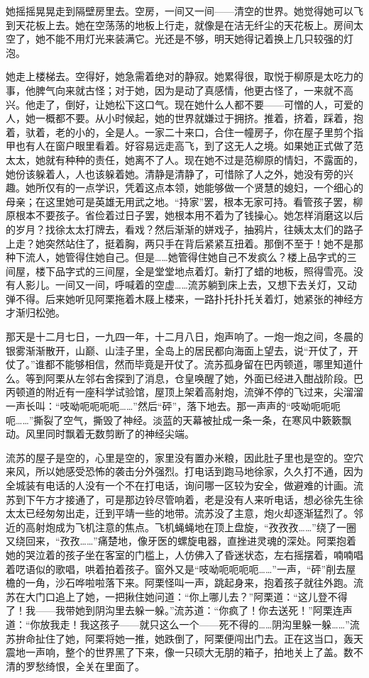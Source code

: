 \par 她摇摇晃晃走到隔壁房里去。空房，一间又一间——清空的世界。她觉得她可以飞到天花板上去。她在空荡荡的地板上行走，就像是在洁无纤尘的天花板上。房间太空了，她不能不用灯光来装满它。光还是不够，明天她得记着换上几只较强的灯泡。
\par 她走上楼梯去。空得好，她急需着绝对的静寂。她累得很，取悦于柳原是太吃力的事，他脾气向来就古怪；对于她，因为是动了真感情，他更古怪了，一来就不高兴。他走了，倒好，让她松下这口气。现在她什么人都不要——可憎的人，可爱的人，她一概都不要。从小时候起，她的世界就嫌过于拥挤。推着，挤着，踩着，抱着，驮着，老的小的，全是人。一家二十来口，合住一幢房子，你在屋子里剪个指甲也有人在窗户眼里看着。好容易远走高飞，到了这无人之境。如果她正式做了范太太，她就有种种的责任，她离不了人。现在她不过是范柳原的情妇，不露面的，她份该躲着人，人也该躲着她。清静是清静了，可惜除了人之外，她没有旁的兴趣。她所仅有的一点学识，凭着这点本领，她能够做一个贤慧的媳妇，一个细心的母亲；在这里她可是英雄无用武之地。“持家”罢，根本无家可持。看管孩子罢，柳原根本不要孩子。省俭着过日子罢，她根本用不着为了钱操心。她怎样消磨这以后的岁月？找徐太太打牌去，看戏？然后渐渐的姘戏子，抽鸦片，往姨太太们的路子上走？她突然站住了，挺着胸，两只手在背后紧紧互扭着。那倒不至于！她不是那种下流人，她管得住她自己。但是……她管得住她自己不发疯么？楼上品字式的三间屋，楼下品字式的三间屋，全是堂堂地点着灯。新打了蜡的地板，照得雪亮。没有人影儿。一间又一间，呼喊着的空虚……流苏躺到床上去，又想下去关灯，又动弹不得。后来她听见阿栗拖着木屐上楼来，一路扑托扑托关着灯，她紧张的神经方才渐归松弛。
\par 那天是十二月七日，一九四一年，十二月八日，炮声响了。一炮一炮之间，冬晨的银雾渐渐散开，山巅、山洼子里，全岛上的居民都向海面上望去，说“开仗了，开仗了。”谁都不能够相信，然而毕竟是开仗了。流苏孤身留在巴丙顿道，哪里知道什么。等到阿栗从左邻右舍探到了消息，仓皇唤醒了她，外面已经进入酣战阶段。巴丙顿道的附近有一座科学试验馆，屋顶上架着高射炮，流弹不停的飞过来，尖溜溜一声长叫：“吱呦呃呃呃呃……”然后“砰”，落下地去。那一声声的“吱呦呃呃呃呃……”撕裂了空气，撕毁了神经。淡蓝的天幕被扯成一条一条，在寒风中簌簌飘动。风里同时飘着无数剪断了的神经尖端。
\par 流苏的屋子是空的，心里是空的，家里没有置办米粮，因此肚子里也是空的。空穴来风，所以她感受恐怖的袭击分外强烈。打电话到跑马地徐家，久久打不通，因为全城装有电话的人没有一个不在打电话，询问哪一区较为安全，做避难的计画。流苏到下午方才接通了，可是那边铃尽管响着，老是没有人来听电话，想必徐先生徐太太已经匆匆出走，迁到平靖一些的地带。流苏没了主意，炮火却逐渐猛烈了。邻近的高射炮成为飞机注意的焦点。飞机蝇蝇地在顶上盘旋，“孜孜孜……”绕了一圈又绕回来，“孜孜……”痛楚地，像牙医的螺旋电器，直挫进灵魂的深处。阿栗抱着她的哭泣着的孩子坐在客室的门槛上，人仿佛入了昏迷状态，左右摇摆着，喃喃唱着呓语似的歌唱，哄着拍着孩子。窗外又是“吱呦呃呃呃呃……”一声，“砰”削去屋檐的一角，沙石哗啦啦落下来。阿栗怪叫一声，跳起身来，抱着孩子就往外跑。流苏在大门口追上了她，一把揪住她问道：“你上哪儿去？”阿栗道：“这儿登不得了！我——我带她到阴沟里去躲一躲。”流苏道：“你疯了！你去送死！”阿栗连声道：“你放我走！我这孩子——就只这么一个——死不得的……阴沟里躲一躲……”流苏拚命扯住了她，阿栗将她一推，她跌倒了，阿栗便闯出门去。正在这当口，轰天震地一声响，整个的世界黑了下来，像一只硕大无朋的箱子，拍地关上了盖。数不清的罗愁绮恨，全关在里面了。
